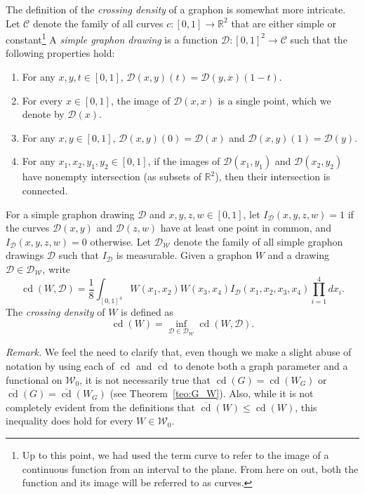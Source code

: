 \documentclass{article}
\begin{document}
The definition of the \textit{crossing density} of a graphon is somewhat more intricate. Let $\mathcal{C}$ denote the family of all curves $c:[0,1]\rightarrow\mathbb{R}^2$ that are either simple or constant\footnote{Up to this point, we had used the term curve to refer to the image of a continuous function from an interval to the plane. From here on out, both the function and its image will be referred to as curves.} A \textit{simple graphon drawing} is a function $\mathcal{D}:[0,1]^2\rightarrow\mathcal{C}$ such that the following properties hold:

\begin{enumerate}
    \item For any $x,y,t\in[0,1]$, $\mathcal{D}(x,y)(t)=\mathcal{D}(y,x)(1-t)$.

    \item For every $x\in[0,1]$, the image of $\mathcal{D}(x,x)$ is a single point, which we denote by $\mathcal{D}(x)$.

    \item For any $x,y\in[0,1]$, $\mathcal{D}(x,y)(0)=\mathcal{D}(x)$ and $\mathcal D(x,y)(1)=\mathcal D(y)$. 
    

    \item For any $x_1,x_2,y_1,y_2\in[0,1]$, if the images of $\mathcal{D}(x_1,y_1)$ and $\mathcal{D}(x_2,y_2)$ have nonempty intersection (as subsets of $\mathbb{R}^2$), then their intersection is connected.
\end{enumerate}

For a simple graphon drawing $\mathcal{D}$ and $x,y,z,w\in[0,1]$, let $I_\mathcal{D}(x,y,z,w)=1$ if the curves $\mathcal{D}(x,y)$ and $\mathcal{D}(z,w)$ have at least one point in common, and $I_\mathcal{D}(x,y,z,w)=0$ otherwise. Let $\mathcal{D}_\mathcal{W}$ denote the family of all simple graphon drawings $\mathcal{D}$ such that $I_\mathcal{D}$ is measurable. Given a graphon $W$ and a drawing $\mathcal{D}\in\mathcal{D}_\mathcal{W}$, write \[\mathop{\mathrm{cd}}(W,\mathcal{D})=\frac{1}{8}\int_{[0,1]^4}W(x_1,x_2)W(x_3,x_4)I_\mathcal{D}(x_1,x_2,x_3,x_4)\prod_{i=1}^4 dx_i.\] The \textit{crossing density} of $W$ is defined as \[\mathop{\mathrm{cd}}(W)=\inf_{\mathcal{D}\in\mathcal{D}_\mathcal{W}}\mathop{\mathrm{cd}}(W,\mathcal{D}).\] 

\noindent\textit{Remark.} We feel the need to clarify that, even though we make a slight abuse of notation by using each of $\mathop{\mathrm{cd}}$ and $\overline{\mathop{\mathrm{cd}}}$ to denote both a graph parameter and a functional on $\mathcal{W}_0$, it is not necessarily true that $\mathop{\mathrm{cd}}(G)=\mathop{\mathrm{cd}}(W_G)$ or $\overline{\mathop{\mathrm{cd}}}(G)=\overline{\mathop{\mathrm{cd}}}(W_G)$ (see Theorem~\ref{teo:G_W}). Also, while it is not completely evident from the definitions that $\overline{\mathop{\mathrm{cd}}}(W)\leq\mathop{\mathrm{cd}}(W)$, this inequality does hold for every $W\in\mathcal{W}_0$.
\end{document}
